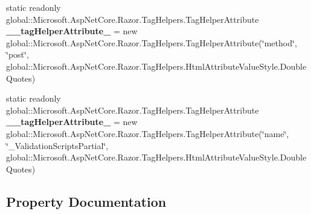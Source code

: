 \begin{DoxyCompactItemize}
\item 
\mbox{\label{class_projeto_e_s_w_1_1_areas_1_1_identity_1_1_pages_1_1_account_1_1_areas___identity___pages___account___login_a71014a3edb408ad58acebb0d20553d99}} 
static readonly global\+::\+Microsoft.\+Asp\+Net\+Core.\+Razor.\+Tag\+Helpers.\+Tag\+Helper\+Attribute {\bfseries \+\_\+\+\_\+tag\+Helper\+Attribute\+\_} = new global\+::\+Microsoft.\+Asp\+Net\+Core.\+Razor.\+Tag\+Helpers.\+Tag\+Helper\+Attribute(\char`\"{}method\char`\"{}, \char`\"{}post\char`\"{}, global\+::\+Microsoft.\+Asp\+Net\+Core.\+Razor.\+Tag\+Helpers.\+Html\+Attribute\+Value\+Style.\+Double\+Quotes)
\item 
\mbox{\label{class_projeto_e_s_w_1_1_areas_1_1_identity_1_1_pages_1_1_account_1_1_areas___identity___pages___account___login_a409fcc80a6200b16df82a5efe84278bb}} 
static readonly global\+::\+Microsoft.\+Asp\+Net\+Core.\+Razor.\+Tag\+Helpers.\+Tag\+Helper\+Attribute {\bfseries \+\_\+\+\_\+tag\+Helper\+Attribute\+\_} = new global\+::\+Microsoft.\+Asp\+Net\+Core.\+Razor.\+Tag\+Helpers.\+Tag\+Helper\+Attribute(\char`\"{}name\char`\"{}, \char`\"{}\+\_\+\+Validation\+Scripts\+Partial\char`\"{}, global\+::\+Microsoft.\+Asp\+Net\+Core.\+Razor.\+Tag\+Helpers.\+Html\+Attribute\+Value\+Style.\+Double\+Quotes)
\end{DoxyCompactItemize}


\subsection{Property Documentation}
\mbox{\label{class_projeto_e_s_w_1_1_areas_1_1_identity_1_1_pages_1_1_account_1_1_areas___identity___pages___account___login_a444e8e037a56f6b6460442df304c8d83}} 
